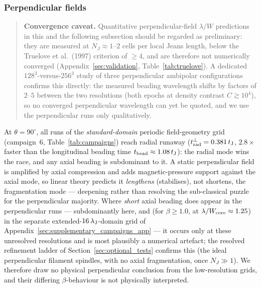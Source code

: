 \documentclass[usenatbib,twoside,twocolumn]{mnras}
\begin{document}
\subsubsection{Perpendicular fields}

\begin{quote}\sloppy\small
\textbf{Convergence caveat.} Quantitative perpendicular-field $\lambda/W$ predictions in this and the following subsection should be regarded as preliminary: they are measured at $N_J\approx1$--$2$ cells per local Jeans length, below the Truelove et al.\ (1997) criterion of $\geq4$, and are therefore not numerically converged (Appendix~\ref{sec:validation}, Table~\ref{tab:truelove}). A dedicated $128^3$-versus-$256^3$ study of three perpendicular ambipolar configurations confirms this directly: the measured beading wavelength shifts by factors of $2$--$5$ between the two resolutions (both epochs at density contrast $C\gtrsim10^4$), so no converged perpendicular wavelength can yet be quoted, and we use the perpendicular runs only qualitatively.
\end{quote}

At $\theta=90^\circ$, all runs of the \emph{standard-domain} periodic field-geometry grid (campaign~6, Table~\ref{tab:campaigns}) reach radial runaway ($t_{\rm rad}^{\perp}=0.381\,t_{\rm J}$, $2.8\times$ faster than the longitudinal beading time $t_{\rm bead}\approx1.08\,t_{\rm J}$): the radial mode wins the race, and any axial beading is subdominant to it. A static perpendicular field is amplified by axial compression and adds magnetic-pressure support against the axial mode, so linear theory \citep{Nagasawa1987,Nakamura1993} predicts it \emph{lengthens} (stabilises), not shortens, the fragmentation mode --- deepening rather than resolving the sub-classical puzzle for the perpendicular majority. Where \emph{short} axial beading does appear in the perpendicular runs --- subdominantly here, and (for $\beta\geq1.0$, at $\lambda/W_{\rm core}\approx1.25$) in the separate extended-$16\,\lambda_{\rm J}$-domain grid of Appendix~\ref{sec:supplementary_campaigns_app} --- it occurs only at these unresolved resolutions and is most plausibly a numerical artefact; the resolved refinement ladder of Section~\ref{sec:optional_tests} confirms this (the ideal perpendicular filament spindles, with no axial fragmentation, once $N_J\gg1$). We therefore draw no physical perpendicular conclusion from the low-resolution grids, and their differing $\beta$-behaviour is not physically interpreted.
\end{document}
